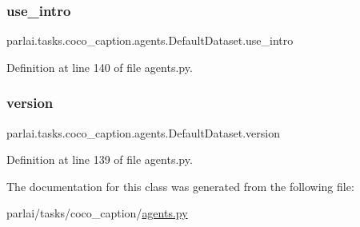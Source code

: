 \subsubsection{\texorpdfstring{use\+\_\+intro}{use\_intro}}
{\footnotesize\ttfamily parlai.\+tasks.\+coco\+\_\+caption.\+agents.\+Default\+Dataset.\+use\+\_\+intro}



Definition at line 140 of file agents.\+py.

\mbox{\label{classparlai_1_1tasks_1_1coco__caption_1_1agents_1_1DefaultDataset_a3f8225c248c5b7f8ccf67aeae46321fc}} 
\subsubsection{\texorpdfstring{version}{version}}
{\footnotesize\ttfamily parlai.\+tasks.\+coco\+\_\+caption.\+agents.\+Default\+Dataset.\+version}



Definition at line 139 of file agents.\+py.



The documentation for this class was generated from the following file\+:\begin{DoxyCompactItemize}
\item 
parlai/tasks/coco\+\_\+caption/\hyperlink{parlai_2tasks_2coco__caption_2agents_8py}{agents.\+py}\end{DoxyCompactItemize}
